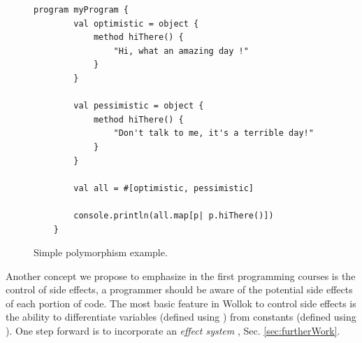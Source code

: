 \begin{figure}[ht]
 \centering
 \begin{lstlisting}[language=Wollok]
	program myProgram {
		val optimistic = object {
			method hiThere() {
				"Hi, what an amazing day !"
			}
		}

		val pessimistic = object {
			method hiThere() {
				"Don't talk to me, it's a terrible day!"
			}
		}
		
		val all = #[optimistic, pessimistic]
		
		console.println(all.map[p| p.hiThere()])
	}
 \end{lstlisting}
 
 \caption{\small Simple polymorphism example.}
 \label{fig:polymorphism}
\end{figure}


\bigskip 
Another concept we propose to emphasize in the first programming courses is the control of side effects, 
\ie a programmer should be aware of the potential side effects of each portion of code.
The most basic feature in Wollok to control side effects is the ability to 
differentiate variables (defined using )
from constants (defined using ).
One step forward is to incorporate an \emph{effect system} \cite{nielson_type_1999}, \cf Sec. \ref{sec:furtherWork}.
